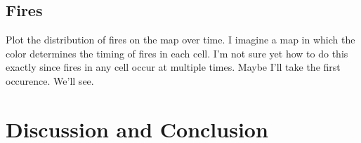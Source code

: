 \section{Fires}
Plot the distribution of fires on the map over time. 
I imagine a map in which the color determines the timing of fires in each cell. 
I'm not sure yet how to do this exactly since fires in any cell occur at multiple times. Maybe I'll take the first occurence. We'll see.



\chapter{Discussion and Conclusion}
